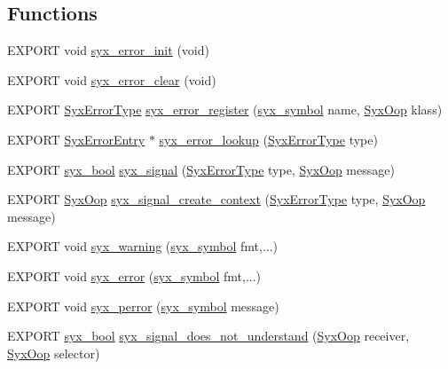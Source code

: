 \subsection*{Functions}
\begin{CompactItemize}
\item 
EXPORT void \hyperlink{syx-error_8h_4b54eb4814b39373904c5e43c46cdf11}{syx\_\-error\_\-init} (void)
\item 
EXPORT void \hyperlink{syx-error_8h_63b0a157b3a7fd7c288561556813094f}{syx\_\-error\_\-clear} (void)
\item 
EXPORT \hyperlink{syx-error_8h_514c3f7a5b2ca79dc0d2ba5e1464a36e}{SyxErrorType} \hyperlink{syx-error_8h_4c29dc7eb28340f780caced4fca607d3}{syx\_\-error\_\-register} (\hyperlink{syx-types_8h_9663af54b7b72f5d8be5f754ef356525}{syx\_\-symbol} name, \hyperlink{syx-types_8h_1121caba2d40b2ce090b640762744ccd}{SyxOop} klass)
\item 
EXPORT \hyperlink{struct_syx_error_entry}{SyxErrorEntry} $\ast$ \hyperlink{syx-error_8h_89af9f1f8208fc5c7f81a1dc2c4bb3ea}{syx\_\-error\_\-lookup} (\hyperlink{syx-error_8h_514c3f7a5b2ca79dc0d2ba5e1464a36e}{SyxErrorType} type)
\item 
EXPORT \hyperlink{syx-types_8h_c6dc09b276b99fa1956364359139daab}{syx\_\-bool} \hyperlink{syx-error_8h_9e42294f55fa2b19c5bd23202111d7e2}{syx\_\-signal} (\hyperlink{syx-error_8h_514c3f7a5b2ca79dc0d2ba5e1464a36e}{SyxErrorType} type, \hyperlink{syx-types_8h_1121caba2d40b2ce090b640762744ccd}{SyxOop} message)
\item 
EXPORT \hyperlink{syx-types_8h_1121caba2d40b2ce090b640762744ccd}{SyxOop} \hyperlink{syx-error_8h_6069be5517f12619d0ffa9d6e3f8345d}{syx\_\-signal\_\-create\_\-context} (\hyperlink{syx-error_8h_514c3f7a5b2ca79dc0d2ba5e1464a36e}{SyxErrorType} type, \hyperlink{syx-types_8h_1121caba2d40b2ce090b640762744ccd}{SyxOop} message)
\item 
EXPORT void \hyperlink{syx-error_8h_d4d9bee8d3e66d1127c3be0d5a2c6213}{syx\_\-warning} (\hyperlink{syx-types_8h_9663af54b7b72f5d8be5f754ef356525}{syx\_\-symbol} fmt,...)
\item 
EXPORT void \hyperlink{syx-error_8h_32ccf51e335c35ba5c51d75a62590e63}{syx\_\-error} (\hyperlink{syx-types_8h_9663af54b7b72f5d8be5f754ef356525}{syx\_\-symbol} fmt,...)
\item 
EXPORT void \hyperlink{syx-error_8h_5498659f88970b75f4e9391eed50d5b2}{syx\_\-perror} (\hyperlink{syx-types_8h_9663af54b7b72f5d8be5f754ef356525}{syx\_\-symbol} message)
\item 
EXPORT \hyperlink{syx-types_8h_c6dc09b276b99fa1956364359139daab}{syx\_\-bool} \hyperlink{syx-error_8h_23779d3e58bbb0dcbaa8af8e77b919da}{syx\_\-signal\_\-does\_\-not\_\-understand} (\hyperlink{syx-types_8h_1121caba2d40b2ce090b640762744ccd}{SyxOop} receiver, \hyperlink{syx-types_8h_1121caba2d40b2ce090b640762744ccd}{SyxOop} selector)
\end{CompactItemize}
